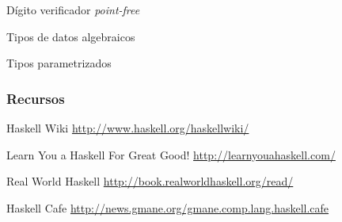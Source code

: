\documentclass[12pt]{beamer}
\begin{document}
\begin{frame}[fragile]
    \begin{block}{Dígito verificador \textit{point-free}}
        
    \end{block}
\end{frame}

\begin{frame}[fragile]
    \begin{block}{Tipos de datos algebraicos}
        
    \end{block}
\end{frame}

\begin{frame}[fragile]
    \begin{block}{Tipos parametrizados}
        
    \end{block}
\end{frame}

\begin{frame}
    \frametitle{Recursos}
    \begin{thebibliography}{99}
        Haskell Wiki
        \newblock \url{http://www.haskell.org/haskellwiki/}

        Learn You a Haskell For Great Good!
        \newblock \url{http://learnyouahaskell.com/}

        Real World Haskell
        \newblock \url{http://book.realworldhaskell.org/read/}

        Haskell Cafe
        \newblock \url{http://news.gmane.org/gmane.comp.lang.haskell.cafe}
    \end{thebibliography}
\end{frame}
\end{document}
